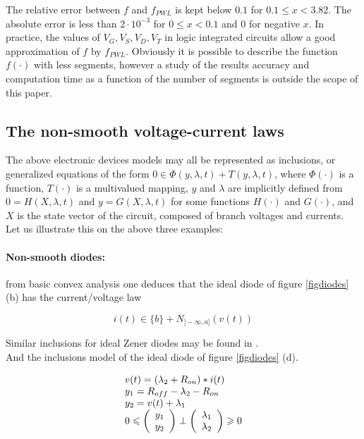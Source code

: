 \documentclass{article}
\def\geq{\geqslant}
\def\leq{\leqslant}
\begin{document}
The relative error between $f$ and $f_{PWL}$ is kept below $0.1$ for $0.1 \leq x < 3.82$. The absolute error is less than $2 \cdot 10^{-3}$ for $0 \leq x < 0.1$ and $0$ for negative $x$. In practice, the values of $V_G,V_S,V_D,V_T$ in logic integrated circuits allow  a good approximation of $f$ by $f_{PWL}$. Obviously it is possible to describe the function $f(\cdot)$ with less segments, however a study of the results accuracy and computation time as a function of the number of segments is outside the scope of this paper. 


\subsection{The non-smooth voltage-current laws} 


The above electronic devices models may all be represented as inclusions, or generalized equations of the form $0 \in \Phi(y,\lambda,t) + T(y,\lambda,t)$, where $\Phi(\cdot)$ is a function, $T(\cdot)$ is a multivalued mapping, $y$ and $\lambda$ are implicitly defined from $0=H(X,\lambda,t)$ and $y=G(X,\lambda,t)$ for some functions $H(\cdot)$ and $G(\cdot)$, and $X$ is the state vector of the circuit, composed of branch voltages and currents. Let us illustrate this on the above three examples: 


\paragraph{Non-smooth  diodes:} from basic convex analysis one deduces that the ideal diode of figure \ref{figdiodes} (b) has the current/voltage law 

\begin{equation}
i(t) \in \{b\}+N_{]-\infty,a]}(v(t))
\end{equation} 

Similar inclusions for ideal Zener diodes may be found in \cite{acary-brogliato2008,addi2009}. \\

And the inclusions model of the ideal diode of figure \ref{figdiodes} (d).

\begin{equation}
  \label{eq:63diode}
  \begin{array}[l]{l}
    v(t)=(\lambda_2+R_{on})*i(t) \\
    y_1=R_{off}-\lambda_2-R_{on}\\
    y_2=v(t)+\lambda_1\\
    0 \leq \left(\begin{array}{c}
y_1\\
y_2
  \end{array}\right) \perp \left(\begin{array}{c}
\lambda_1\\
\lambda_2
  \end{array}\right) \geq 0
\end{array}
\end{equation}
\end{document}
